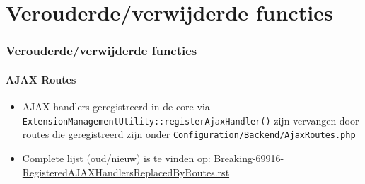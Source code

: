 %

\section{Verouderde/verwijderde functies}


\begin{frame}[fragile]
	\frametitle{Verouderde/verwijderde functies}
	\framesubtitle{AJAX Routes}

	\begin{itemize}

		\item AJAX handlers geregistreerd in de core via
			\texttt{ExtensionManagementUtility::registerAjaxHandler()}
			zijn vervangen door routes die geregistreerd zijn onder
			\texttt{Configuration/Backend/AjaxRoutes.php}

		\item Complete lijst (oud/nieuw) is te vinden op:\newline
				\href{https://forge.typo3.org/projects/typo3cms-core/repository/revisions/3f0fb6229ba391356e5ed4984eb1c9418ba6663e/entry/typo3/sysext/core/Documentation/Changelog/master/Breaking-69916-RegisteredAJAXHandlersReplacedByRoutes.rst}{Breaking-69916-RegisteredAJAXHandlersReplacedByRoutes.rst}
	\end{itemize}

\end{frame}


